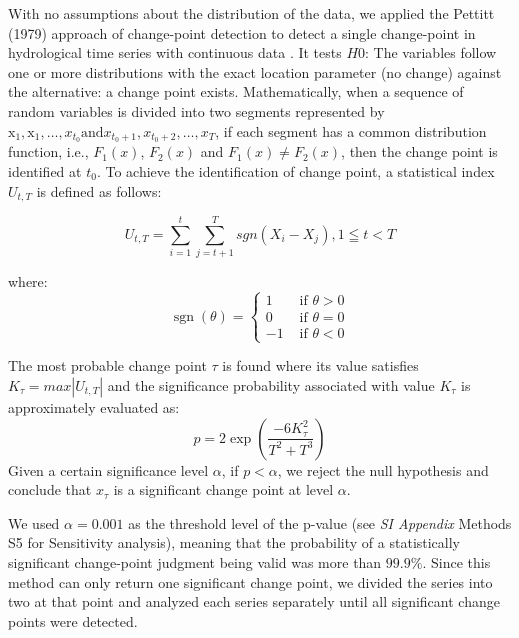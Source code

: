 		With no assumptions about the distribution of the data, we applied the Pettitt (1979) approach of change-point detection to detect a single change-point in hydrological time series with continuous data
        \cite{pettittNonParametricApproachChangePoint1979}.
		It tests $H0$: The variables follow one or more distributions with the exact location parameter (no change) against the alternative: a change point exists.
		Mathematically, when a sequence of random variables is divided into two segments represented by $\mathrm{x}_{1}, \mathrm{x}_{1}, \ldots, x_{t_{0}} \text{and} x_{t_{0}+1}, x_{t_{0}+2}, \ldots, x_{T}$, if each segment has a common distribution function, i.e., $F_1(x)$, $F_2(x)$ and $F_1(x) \neq F_2(x)$, then the change point is identified at $t_0$. To achieve the identification of change point, a statistical index $U_{t,T}$ is defined as follows:

		\begin{equation}
			U_{t, T} = \sum_{i=1}^t\sum_{j=t+1}^T sgn(X_i - X_j), 1 \leqq t < T
		\end{equation}

		where:
		\begin{equation}
			\operatorname{sgn}(\theta)= \begin{cases}1 & \text { if } \theta>0 \\ 0 & \text { if } \theta=0 \\ -1 & \text { if } \theta<0\end{cases}
		\end{equation}

		The most probable change point $\tau$ is found where its value satisfies $K_{\tau} = max|U_{t, T}|$ and the significance probability associated with value $K_{\tau}$ is approximately evaluated as:
		\begin{equation}
			p=2 \exp \left(\frac{-6 K_{\tau}^{2}}{T^{2}+T^{3}}\right)
		\end{equation}
		Given a certain significance level $\alpha$, if $p < \alpha$, we reject the null hypothesis and conclude that $x_{\tau}$ is a significant change point at level $\alpha$.

		We used $\alpha = 0.001$ as the threshold level of the p-value (see \textit{SI Appendix} Methods S5 for Sensitivity analysis), meaning that the probability of a statistically significant change-point judgment being valid was more than $99.9\%$.
		Since this method can only return one significant change point, we divided the series into two at that point and analyzed each series separately until all significant change points were detected.

